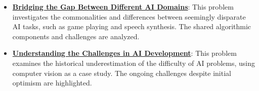 \documentclass{article}%
\begin{document}
\begin{itemize}[leftmargin=*]
\item \href{\url{https://purdue.brightspace.com/d2l/common/assets/pdfjs-d2l-dist/1.0.14-legacy/web/viewer.html?file=\%252Fcontent\%252Fenforced\%252F1095467-wl.202510.CS.24300.001\%252F02L2-Intro.pdf\%253Fou\%253D1095467\&lang=en-us\&container=d2l-fileviewer-rendered-pdf\&fullscreen=d2l-fileviewer-rendered-pdf-dialog\&height=667}#page=31}{\textbf{Bridging the Gap Between Different AI Domains}}: This problem investigates the commonalities and differences between seemingly disparate AI tasks, such as game playing and speech synthesis. The shared algorithmic components and challenges are analyzed.%
\item \href{\url{https://purdue.brightspace.com/d2l/common/assets/pdfjs-d2l-dist/1.0.14-legacy/web/viewer.html?file=\%252Fcontent\%252Fenforced\%252F1095467-wl.202510.CS.24300.001\%252F02L2-Intro.pdf\%253Fou\%253D1095467\&lang=en-us\&container=d2l-fileviewer-rendered-pdf\&fullscreen=d2l-fileviewer-rendered-pdf-dialog\&height=667}#page=15}{\textbf{Understanding the Challenges in AI Development}}: This problem examines the historical underestimation of the difficulty of AI problems, using computer vision as a case study. The ongoing challenges despite initial optimism are highlighted.%
\end{itemize}

%
\end{document}
